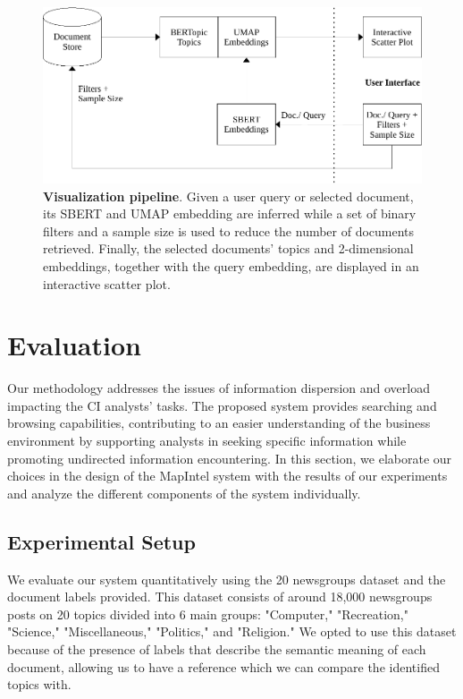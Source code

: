\documentclass[a4paper]{article}
\begin{document}
\begin{figure}[H]
	\centering
	\includegraphics[scale=0.7]{./assets/vis_pipeline}
	\caption{\textbf{Visualization pipeline}. Given a user query or selected document, its SBERT and UMAP embedding are inferred while a set of binary filters and a sample size is used to reduce the number of documents retrieved. Finally, the selected documents' topics and 2-dimensional embeddings, together with the query embedding, are displayed in an interactive scatter plot.}
	\label{vis_pipeline}
\end{figure}

\section{Evaluation}
Our methodology addresses the issues of information dispersion and overload impacting the CI analysts' tasks. The proposed system provides searching and browsing capabilities, contributing to an easier understanding of the business environment by supporting analysts in seeking specific information while promoting undirected information encountering. In this section, we elaborate our choices in the design of the MapIntel system with the results of our experiments and analyze the different components of the system individually.

\subsection{Experimental Setup}
We evaluate our system quantitatively using the 20 newsgroups \citep{pedregosa2011} dataset and the document labels provided. This dataset consists of around 18,000 newsgroups posts on 20 topics divided into 6 main groups: "Computer," "Recreation," "Science," "Miscellaneous," "Politics," and "Religion." We opted to use this dataset because of the presence of labels that describe the semantic meaning of each document, allowing us to have a reference which we can compare the identified topics with.
\end{document}
